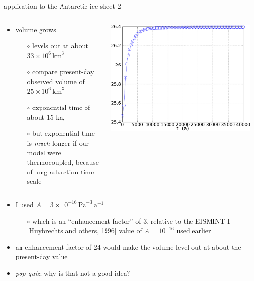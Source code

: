 \begin{frame}{application to the Antarctic ice sheet 2}

\begin{columns}
\begin{column}{0.6\textwidth}
\begin{itemize}
\item volume grows
  \begin{itemize}
  \item[$\circ$] levels out at about $33 \times 10^6\,\text{km}^3$
  \item[$\circ$] compare present-day observed volume of $25 \times 10^6\,\text{km}^3$
  \item[$\circ$] exponential time of about 15 ka,
  \item[$\circ$] but exponential time is \emph{much} longer if our model were thermocoupled, because of long advection time-scale  
  \end{itemize}
\end{itemize}
\end{column}
\begin{column}{0.45\textwidth}
\includegraphics[width=1.0\textwidth]{photos/antvol}
\end{column}
\end{columns}

\begin{itemize}
\item I used $A = 3\times 10^{-16}\,\text{Pa}^{-3}\,\text{a}^{-1}$ 
  \begin{itemize}
  \item[$\circ$] which is an ``enhancement factor'' of 3, \scriptsize relative to the EISMINT I [Huybrechts and others, 1996] value of $A=10^{-16}$ used earlier\small
  \end{itemize}
\item an enhancement factor of 24 would make the volume level out at about the present-day value
\item \emph{pop quiz}:  why is that not a good idea?
\end{itemize}
\end{frame}


